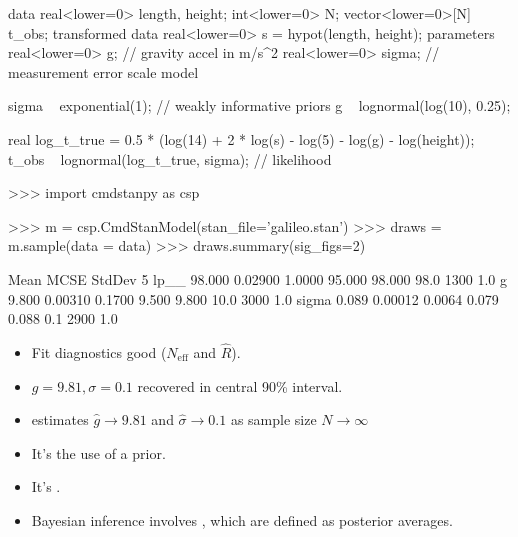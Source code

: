 \documentclass[10pt]{report}
\begin{document}
\vspace*{-6pt}
\begin{stancode}
data {
  real<lower=0> length, height;  int<lower=0> N;  vector<lower=0>[N] t_obs;
}
transformed data {
  real<lower=0> s = hypot(length, height);
}
parameters {
  real<lower=0> g;      // gravity accel in m/s^2
  real<lower=0> sigma;  // measurement error scale
}
model {
  sigma ~ exponential(1);                 // weakly informative priors
  g ~ lognormal(log(10), 0.25);

  real log_t_true = 0.5 * (log(14) + 2 * log(s) - log(5) - log(g) - log(height));
  t_obs ~ lognormal(log_t_true, sigma);   // likelihood
}
\end{stancode}

\begin{stancode}
>>> import cmdstanpy as csp

>>> m = csp.CmdStanModel(stan_file='galileo.stan')
>>> draws = m.sample(data = data)
>>> draws.summary(sig_figs=2)
  
         Mean     MCSE  StdDev      5%
lp__   98.000  0.02900  1.0000  95.000  98.000  98.0   1300    1.0
g       9.800  0.00310  0.1700   9.500   9.800  10.0   3000    1.0
sigma   0.089  0.00012  0.0064   0.079   0.088   0.1   2900    1.0
\end{stancode}
\begin{itemize}
\item Fit diagnostics good ($N_\text{eff}$ and $\widehat{R}$).
\item $g = 9.81, \sigma = 0.1$ recovered in
  central 90\% interval.
\item estimates $\widehat{g} \rightarrow 9.81$ and $\widehat{\sigma} \rightarrow 0.1$ as
  sample size $N \rightarrow \infty$
\end{itemize}



\begin{itemize}
\item It's  the use of a prior.
\item It's .
\item Bayesian inference involves ,
  which are defined as posterior averages.
\end{itemize}
\end{document}
